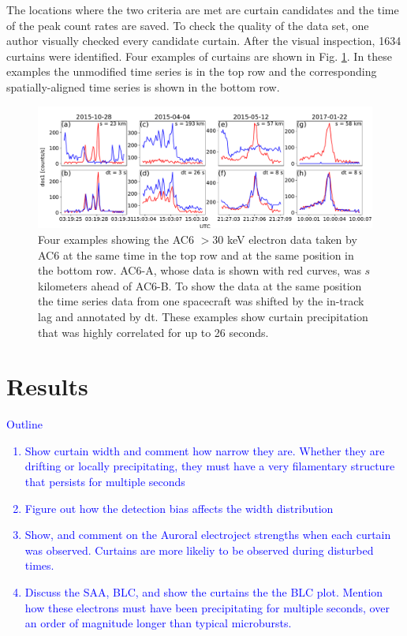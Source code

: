 \documentclass[draft]{agujournal2019}
\begin{document}
The locations where the two criteria are met are curtain candidates and the time of the peak count rates are saved. To check the quality of the data set, one author visually checked every candidate curtain. After the visual inspection, 1634 curtains were identified. Four examples of curtains are shown in Fig. \ref{fig1}. In these examples the unmodified time series is in the top row and the corresponding spatially-aligned time series is shown in the bottom row. 

\begin{figure}
\includegraphics[width=\textwidth]{fig1.pdf}
\caption{Four examples showing the AC6 $> 30$ keV electron data taken by AC6 at the same time in the top row and at the same position in the bottom row. AC6-A, whose data is shown with red curves, was $s$ kilometers ahead of AC6-B. To show the data at the same position the time series data from one spacecraft was shifted by the in-track lag and annotated by dt. These examples show curtain precipitation that was highly correlated for up to 26 seconds.}
\label{fig1}
\end{figure}

\section{Results} \label{results}
\textcolor{blue}{
Outline
\begin{enumerate}
\item Show curtain width and comment how narrow they are. Whether they are drifting or locally precipitating, they must have a very filamentary structure that persists for multiple seconds
\item Figure out how the detection bias affects the width distribution
\item Show, and comment on the Auroral electroject strengths when each curtain was observed. Curtains are more likeliy to be observed during disturbed times.
\item Discuss the SAA, BLC, and show the curtains the the BLC plot. Mention how these electrons must have been precipitating for multiple seconds, over an order of magnitude longer than typical microbursts.
\end{enumerate}
}
\end{document}
